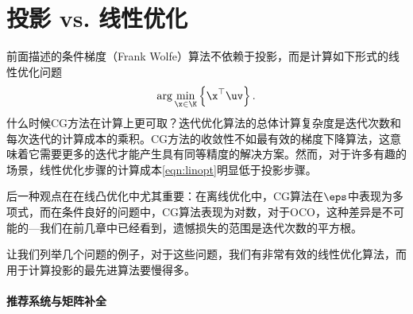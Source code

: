 \section{
    投影 vs. 线性优化
    }

前面描述的条件梯度（Frank Wolfe）算法不依赖于投影，而是计算如下形式的线性优化问题
\begin{equation} \label{eqn:linopt}
 \arg \min_{\x \in \K} \left\{\x^\top \uv \right\}. 
\end{equation}
什么时候CG方法在计算上更可取？迭代优化算法的总体计算复杂度是迭代次数和每次迭代的计算成本的乘积。CG方法的收敛性不如最有效的梯度下降算法，这意味着它需要更多的迭代才能产生具有同等精度的解决方案。然而，对于许多有趣的场景，线性优化步骤的计算成本\eqref{eqn:linopt}明显低于投影步骤。

后一种观点在在线凸优化中尤其重要：在离线优化中，CG算法在$\eps$中表现为多项式，而在条件良好的问题中，CG算法表现为对数，对于OCO，这种差异是不可能的---我们在前几章中已经看到，遗憾损失的范围是迭代次数的平方根。

让我们列举几个问题的例子，对于这些问题，我们有非常有效的线性优化算法，而用于计算投影的最先进算法要慢得多。

\paragraph*{
    推荐系统与矩阵补全
    }

